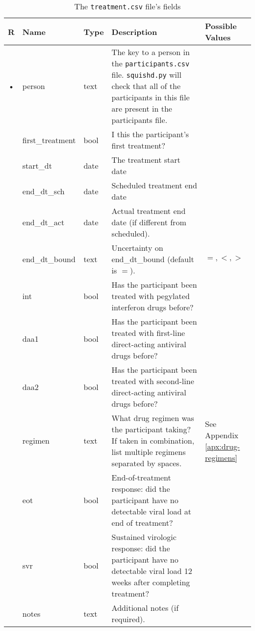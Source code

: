 \documentclass{article}
\begin{document}
\begin{table}
  \centering
  \caption{The \texttt{treatment.csv} file's fields}
  \label{tbl:treatment.csv}
  \begin{tabular}{cllp{6cm}p{4cm}}
    R & Name                & Type      & Description   & Possible Values\\ \hline
    • & person              & text    & The key to a person in the \texttt{participants.csv}
    file. \texttt{squishd.py} will check that all of the participants in this file
    are present in the participants file. & \\
      & first\_treatment    & bool      & I this the participant's first treatment? & \\
      & start\_dt           & date      & The treatment start date & \\
      & end\_dt\_sch        & date      & Scheduled treatment end date & \\
      & end\_dt\_act        & date      & Actual treatment end date (if different from scheduled). \\
      & end\_dt\_bound      & text    &
    Uncertainty on end\_dt\_bound (default is $=$). & $=, <, >$ \\
      & int                 & bool      & Has the participant been treated with pegylated interferon drugs before? & \\
      & daa1                & bool      & Has the participant been treated with first-line direct-acting antiviral drugs before? & \\
      & daa2                & bool      & Has the participant been treated with second-line direct-acting antiviral drugs before? & \\
      & regimen             & text    & What drug regimen was the participant taking? If taken in combination, list multiple regimens separated by spaces. & See Appendix \ref{apx:drug-regimens} \\
      & eot                 & bool      & End-of-treatment response: did the participant have no detectable viral load at end of treatment? & \\
      & svr                 & bool      & Sustained virologic response: did the participant have no detectable viral load 12 weeks after completing treatment? & \\
      & notes               & text    & Additional notes (if required). & \\
  \end{tabular}
\end{table}
\end{document}
